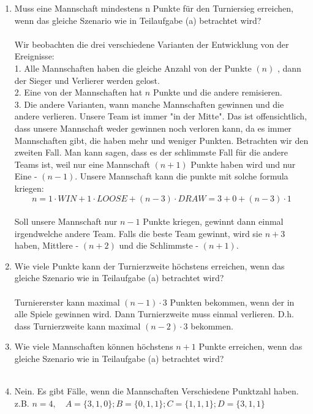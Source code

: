 \begin{enumerate}[label=(\alph*)]
        \item Muss eine Mannschaft mindestens n Punkte für den Turniersieg erreichen, wenn das
		gleiche Szenario wie in Teilaufgabe (a) betrachtet wird? \\ \\
         Wir beobachten die drei verschiedene Varianten der Entwicklung von der Ereignisse: \\
        1. Alle Mannschaften haben die gleiche Anzahl von der Punkte $(n)$ , dann der Sieger und Verlierer werden gelost. \\
        2. Eine von der Mannschaften hat $n$ Punkte und die andere remisieren. \\
        3. Die andere Varianten, wann manche Mannschaften gewinnen und die andere verlieren. Unsere Team ist immer "in der Mitte". Das ist offensichtlich, dass unsere Mannschaft weder gewinnen noch verloren kann, da es immer Mannschaften gibt, die haben mehr und weniger Punkten.
        	Betrachten wir den zweiten Fall. Man kann sagen, dass es der schlimmste Fall für die andere Teams ist, weil nur eine Mannschaft  $(n+1)$ Punkte haben wird und nur Eine - $(n-1)$. Unsere Mannschaft kann die punkte mit solche formula kriegen:
        	$$n= 1 \cdot WIN + 1\cdot LOOSE + (n-3) \cdot DRAW = 3 + 0 + (n-3)\cdot 1 $$ \\
        	Soll unsere Mannschaft nur $n-1$ Punkte kriegen, gewinnt dann einmal irgendwelche andere Team. Falls die beste Team gewinnt, wird sie $n+3$ haben, Mittlere - $(n+2)$ und die Schlimmste - $(n+1)$.
        
        \item Wie viele Punkte kann der Turnierzweite höchstens erreichen, wenn das gleiche Szenario
		wie in Teilaufgabe (a) betrachtet wird? \\\\
		Turniererster kann maximal $(n-1)\cdot 3$ Punkten bekommen, wenn der in alle Spiele gewinnen 
		wird. Dann Turnierzweite muss einmal verlieren. D.h. dass Turnierzweite kann maximal 
		$(n-2)\cdot 3$ bekommen.
        
        \item Wie viele Mannschaften können höchstens $n + 1$ Punkte erreichen, wenn das gleiche
		Szenario wie in Teilaufgabe (a) betrachtet wird? \\\\
		  
        
        \item Nein. Es gibt F\"alle, wenn die Mannschaften Verschiedene Punktzahl haben. \\
        z.B. $n=4, \quad A=\{3,1,0\}; B=\{0,1,1\}; C=\{1,1,1\}; D= \{3,1,1 \}$
        

\end{enumerate}
